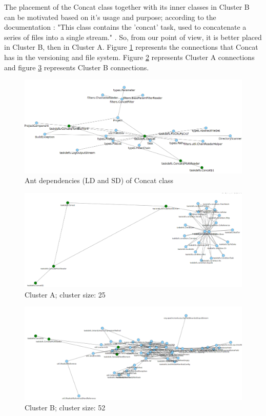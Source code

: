 \documentclass[conference]{IEEEtran}
\begin{document}
The placement of the Concat class together with its inner classes in Cluster B can be motivated based on it's usage and purpose; according to the documentation : "This class contains the 'concat' task, used to concatenate a series of files into a single stream." \cite{ant_concat}. 
So, from our point of view, it is better placed in Cluster B, then in Cluster A.
Figure \ref{fig:cluster1} represents the connections that Concat has in the versioning and file system. Figure \ref{fig:clusterA} represents Cluster A connections and figure \ref{fig:clusterB} represents Cluster B connections.



\begin{figure}
\centering
\includegraphics[width=\columnwidth]{dep.png}
\caption{Ant dependencies (LD and SD) of Concat class}
\label{fig:cluster1}
\centering
\end{figure}

\begin{figure}
\centering
\includegraphics[width=\columnwidth]{cluster1.png}
\caption{Cluster A; cluster size: 25}
\label{fig:clusterA}
\centering
\end{figure}


\begin{figure}
\centering
\includegraphics[width=\columnwidth]{cluster2.png}
\caption{Cluster B; cluster size: 52}
\label{fig:clusterB}
\centering
\end{figure}
\end{document}
